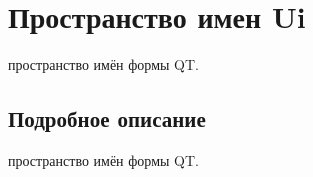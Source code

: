\hypertarget{namespace_ui}{}\section{Пространство имен Ui}
\label{namespace_ui}


пространство имён формы QT.  




\subsection{Подробное описание}
пространство имён формы QT. 